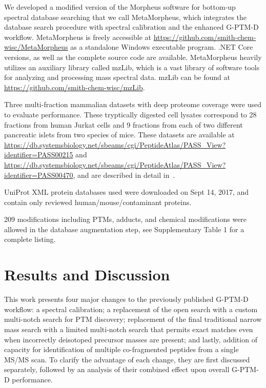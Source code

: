\documentclass[journal=jprobs,manuscript=article]{achemso}
\begin{document}
We developed a modified version of the Morpheus software for bottom-up spectral database searching\citep{Wenger_2013} that we call MetaMorpheus, which integrates the database search procedure with spectral calibration and the enhanced G-PTM-D workflow.
MetaMorpheus is freely accessible at \url{https://github.com/smith-chem-wisc/MetaMorpheus} as a standalone Windows executable program.
.NET Core versions, as well as the complete source code are available.
MetaMorpheus heavily utilizes an auxiliary library called mzLib, which is a vast library of software tools for analyzing and processing mass spectral data.
mzLib can be found at \url{https://github.com/smith-chem-wisc/mzLib}.

Three multi-fraction mammalian datasets with deep proteome coverage were used to evaluate performance.
These tryptically digested cell lysates correspond to 28 fractions from human Jurkat cells and 9 fractions from each of two different pancreatic islets from two species of mice.
These datasets are available at \url{https://db.systemsbiology.net/sbeams/cgi/PeptideAtlas/PASS_View?identifier=PASS00215} and \url{https://db.systemsbiology.net/sbeams/cgi/PeptideAtlas/PASS_View?identifier=PASS00470}, and are described in detail in~\citep{Shortreed_2015, Cesnik_2016}.

UniProt XML protein databases used were downloaded on Sept 14, 2017, and contain only reviewed human/mouse/contaminant proteins.

209 modifications including PTMs, adducts, and chemical modifications were allowed in the database augmentation step, see Supplementary Table 1 for a complete listing.

\section{Results and Discussion}

This work presents four major changes to the previously published G-PTM-D workflow:
a spectral calibration;
a replacement of the open search with a custom multi-notch search for PTM discovery;
replacement of the final traditional narrow mass search with a limited multi-notch search that permits exact matches even when incorrectly deisotoped precursor masses are present;
and lastly, addition of capacity for identification of multiple co-fragmented peptides from a single MS/MS scan.
To clarify the advantage of each change, they are first discussed separately, followed by an analysis of their combined effect upon overall G-PTM-D performance.
\end{document}
